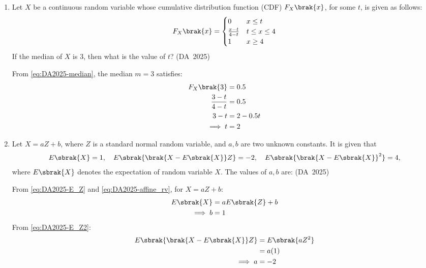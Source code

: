 \begin{enumerate}[label=\thesubsection.\arabic*, ref=\thesubsection.\theenumi]
	\item 
	Let $X$ be a continuous random variable whose cumulative distribution function (CDF) $F_X\brak{x}$, for some $t$, is given as follows:
	\begin{align}
		F_X\brak{x} = \begin{cases}
			0 & x \le t \\
			\frac{x - t}{4 - t} & t \le x \le 4 \\
			1 & x \ge 4
		\end{cases}
	\end{align}
	If the median of $X$ is 3, then what is the value of $t$?
	\hfill (DA~2025)
	\begin{enumerate}
	\end{enumerate}
	\solution
	From \eqref{eq:DA2025-median}, the median $m = 3$ satisfies:
	\begin{align}
		F_X\brak{3} &= 0.5
		\\
		\frac{3 - t}{4 - t} &= 0.5
		\\
		3 - t &= 2 - 0.5t
		\\
		\implies t &= 2
	\end{align}
	
	\item 
	Let $X = aZ + b$, where $Z$ is a standard normal random variable, and $a, b$ are two unknown constants. It is given that
	\begin{align}
		E\sbrak{X} = 1, \quad E\sbrak{\brak{X - E\sbrak{X}}Z} = -2, \quad E\sbrak{\brak{X - E\sbrak{X}}^2} = 4,
	\end{align}
	where $E\sbrak{X}$ denotes the expectation of random variable $X$. The values of $a, b$ are:
	\hfill (DA~2025)
	\begin{enumerate}
		\begin{multicols}{2}
			\item $a = -2, \; b = 1$
			\item $a = 2, \; b = -1$
			\item $a = -2, \; b = -1$
			\item $a = 1, \; b = 1$
		\end{multicols}
	\end{enumerate}
	\solution
	From \eqref{eq:DA2025-E_Z} and \eqref{eq:DA2025-affine_rv}, for $X = aZ + b$:
	\begin{align}
		E\sbrak{X} &= aE\sbrak{Z} + b
		\\
		\implies b &= 1
	\end{align}
	From \eqref{eq:DA2025-E_Z2}:
	\begin{align}
		E\sbrak{\brak{X - E\sbrak{X}}Z} &= E\sbrak{aZ^2}
		\\
		&= a(1)
		\\
		\implies a &= -2
	\end{align}
	

\end{enumerate}
